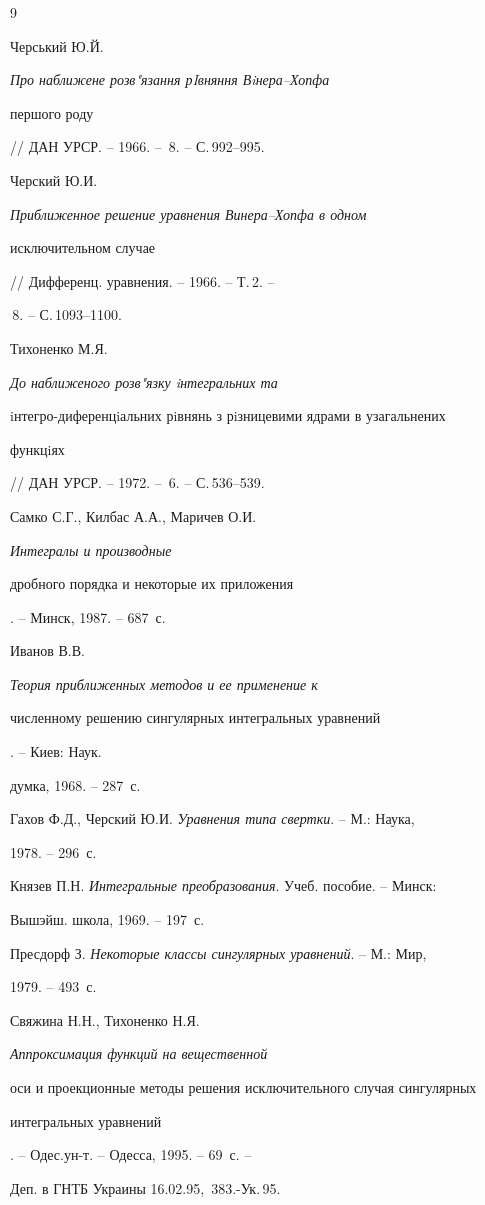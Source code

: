 \begin{thebibliography}{9} 


 




Черський Ю.Й. {\em Про наближене розв"язання рIвняння Вiнера--Хопфа 


першого роду} // ДАН УРСР. -- 1966. -- \No\,8. -- С.\,992--995. 




Черский Ю.И. {\em Приближенное решение уравнения Винера--Хопфа в одном 


исключительном случае} // Дифференц. уравнения. -- 1966. -- Т.\,2. -- 


\No\,8. -- С.\,1093--1100. 




Тихоненко М.Я. {\em До наближеного розв"язку iнтегральних та 


iнтегро-диференцiальних рiвнянь з рiзницевими ядрами в узагальнених 


функцiях} // ДАН УРСР. -- 1972. -- \No\,6. -- С.\,536--539. 




Самко С.Г., Килбас А.А., Маричев О.И. {\em Интегралы и производные 


дробного порядка и некоторые их приложения}. -- Минск, 1987. -- 687~с. 




Иванов В.В. {\em Теория приближенных методов и ее применение к 


численному решению сингулярных интегральных уравнений}. -- Киев: Наук. 


думка, 1968. -- 287~с. 




Гахов Ф.Д., Черский Ю.И. {\em Уравнения типа свертки}. -- М.: Наука, 


1978. -- 296~с. 




Князев П.Н. {\em Интегральные преобразования}. Учеб. пособие. -- Минск: 


Вышэйш. школа, 1969. -- 197~с. 




Пресдорф З. {\em Некоторые классы сингулярных уравнений}. -- М.: Мир, 


1979. -- 493~с. 




Свяжина Н.Н., Тихоненко Н.Я. {\em Аппроксимация функций на вещественной 


оси и проекционные методы решения исключительного случая сингулярных 


интегральных уравнений}. -- Одес.\linebreak ун-т. -- Одесса, 1995. -- 69~с. -- 


Деп. в ГНТБ Украины 16.02.95, \No\,383.-Ук.\,95. 


 


 


\end{thebibliography} 


